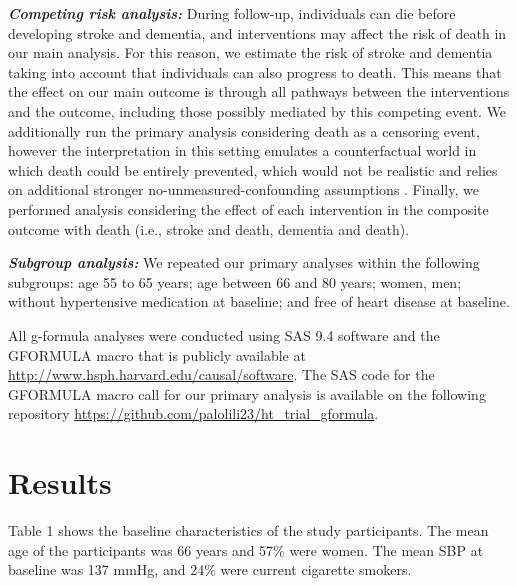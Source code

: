 \documentclass[
]{book}
\begin{document}
\textbf{\emph{Competing risk analysis:}} During follow-up, individuals can die before developing stroke and dementia, and interventions may affect the risk of death in our main analysis. For this reason, we estimate the risk of stroke and dementia taking into account that individuals can also progress to death. This means that the effect on our main outcome is through all pathways between the interventions and the outcome, including those possibly mediated by this competing event. We additionally run the primary analysis considering death as a censoring event, however the interpretation in this setting emulates a counterfactual world in which death could be entirely prevented, which would not be realistic and relies on additional stronger no-unmeasured-confounding assumptions \autocite{young2020}. Finally, we performed analysis considering the effect of each intervention in the composite outcome with death (i.e., stroke and death, dementia and death).

\textbf{\emph{Subgroup analysis:}} We repeated our primary analyses within the following subgroups: age 55 to 65 years; age between 66 and 80 years; women, men; without hypertensive medication at baseline; and free of heart disease at baseline.

All g-formula analyses were conducted using SAS 9.4 software and the GFORMULA macro that is publicly available at \url{http://www.hsph.harvard.edu/causal/software}. The SAS code for the GFORMULA macro call for our primary analysis is available on the following repository
\url{https://github.com/palolili23/ht_trial_gformula}.

\hypertarget{results-1}{%
\section{Results}\label{results-1}}

Table 1 shows the baseline characteristics of the study participants. The mean age of the participants was 66 years and 57\% were women. The mean SBP at baseline was 137 mmHg, and 24\% were current cigarette smokers.
\end{document}
